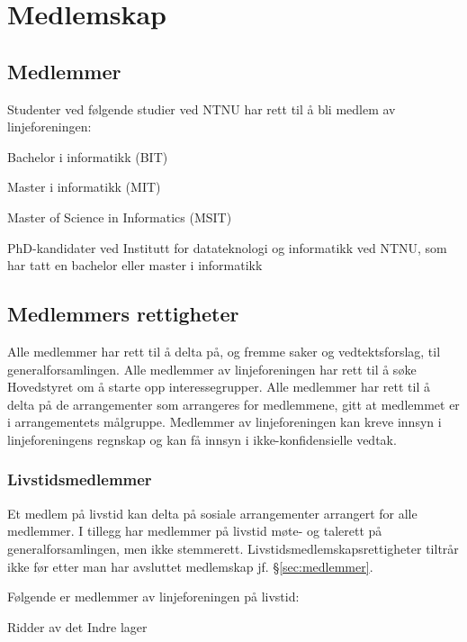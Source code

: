 \chapter{Medlemskap}\label{chapter:medlemskap}

\section{Medlemmer}{\label{sec:medlemmer}
\vspace{23pt}

Studenter ved følgende studier ved NTNU har rett til å bli medlem av linjeforeningen:
\begin{liste}
	\item Bachelor i informatikk (BIT)
	\item Master i informatikk (MIT)
	\item Master of Science in Informatics (MSIT)
    \item PhD-kandidater ved Institutt for datateknologi og informatikk ved NTNU, som har tatt en bachelor eller master i informatikk
\end{liste}
}
\section{Medlemmers rettigheter}
\vspace{23pt}
Alle medlemmer har rett til å delta på, og fremme saker og vedtektsforslag, til generalforsamlingen. Alle medlemmer av linjeforeningen har rett til å søke Hovedstyret om å starte opp interessegrupper. Alle medlemmer har rett til å delta på de arrangementer som arrangeres for medlemmene, gitt at medlemmet er i arrangementets målgruppe. Medlemmer av linjeforeningen kan kreve innsyn i linjeforeningens regnskap og kan få innsyn i ikke-konfidensielle vedtak.

\subsection{Livstidsmedlemmer}{
Et medlem på livstid kan delta på sosiale arrangementer arrangert for alle medlemmer. I tillegg har medlemmer på livstid møte- og talerett på generalforsamlingen, men ikke stemmerett. Livstidsmedlemskapsrettigheter tiltrår ikke før etter man har avsluttet medlemskap jf. §\ref{sec:medlemmer}.

Følgende er medlemmer av linjeforeningen på livstid:
\begin{liste}
	\item Ridder av det Indre lager
\end{liste}

}
